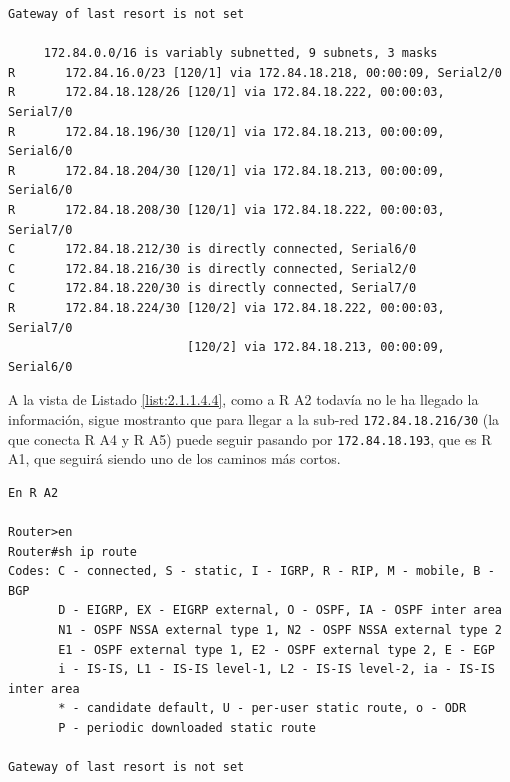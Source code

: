 \documentclass[twoside, 11pt]{article}
\begin{document}
\begin{enumerate}
\begin{center}
\begin{verbatim}
Gateway of last resort is not set

     172.84.0.0/16 is variably subnetted, 9 subnets, 3 masks
R       172.84.16.0/23 [120/1] via 172.84.18.218, 00:00:09, Serial2/0
R       172.84.18.128/26 [120/1] via 172.84.18.222, 00:00:03, Serial7/0
R       172.84.18.196/30 [120/1] via 172.84.18.213, 00:00:09, Serial6/0
R       172.84.18.204/30 [120/1] via 172.84.18.213, 00:00:09, Serial6/0
R       172.84.18.208/30 [120/1] via 172.84.18.222, 00:00:03, Serial7/0
C       172.84.18.212/30 is directly connected, Serial6/0
C       172.84.18.216/30 is directly connected, Serial2/0
C       172.84.18.220/30 is directly connected, Serial7/0
R       172.84.18.224/30 [120/2] via 172.84.18.222, 00:00:03, Serial7/0
                         [120/2] via 172.84.18.213, 00:00:09, Serial6/0
\end{verbatim}
\label{list:2.1.1.4.3}
\end{center}

A la vista de Listado \ref{list:2.1.1.4.4}, como a R A2 todavía no le ha llegado la información, sigue mostranto que para llegar a la sub-red \texttt{172.84.18.216/30} (la que conecta R A4 y R A5) puede seguir pasando por \texttt{172.84.18.193}, que es R A1, que seguirá siendo uno de los caminos más cortos.

\begin{center}
\begin{verbatim}
En R A2

Router>en
Router#sh ip route 
Codes: C - connected, S - static, I - IGRP, R - RIP, M - mobile, B - BGP
       D - EIGRP, EX - EIGRP external, O - OSPF, IA - OSPF inter area
       N1 - OSPF NSSA external type 1, N2 - OSPF NSSA external type 2
       E1 - OSPF external type 1, E2 - OSPF external type 2, E - EGP
       i - IS-IS, L1 - IS-IS level-1, L2 - IS-IS level-2, ia - IS-IS inter area
       * - candidate default, U - per-user static route, o - ODR
       P - periodic downloaded static route

Gateway of last resort is not set


\end{verbatim}
\end{center}
\end{enumerate}
\end{document}
